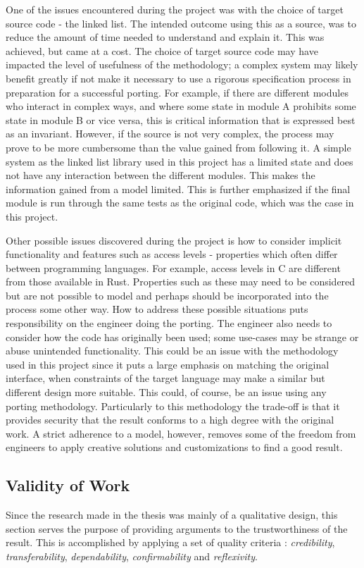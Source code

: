 One of the issues encountered during the project was with the choice of target source code - the linked list. The intended outcome using this as a source, was to reduce the amount of time needed to understand and explain it. This was achieved, but came at a cost. The choice of target source code may have impacted the level of usefulness of the methodology; a complex system may likely benefit greatly if not make it necessary to use a rigorous specification process in preparation for a successful porting. For example, if there are different modules who interact in complex ways, and where some state in module A prohibits some state in module B or vice versa, this is critical information that is expressed best as an invariant. However, if the source is not very complex, the process may prove to be more cumbersome than the value gained from following it. A simple system as the linked list library used in this project has a limited state and does not have any interaction between the different modules. This makes the information gained from a model limited. This is further emphasized if the final module is run through the same tests as the original code, which was the case in this project.

Other possible issues discovered during the project is how to consider implicit functionality and features such as access levels - properties which often differ between programming languages. For example, access levels in C are different from those available in Rust. Properties such as these may need to be considered but are not possible to model and perhaps should be incorporated into the process some other way. How to address these possible situations puts responsibility on the engineer doing the porting. The engineer also needs to consider how the code has originally been used; some use-cases may be strange or abuse unintended functionality. This could be an issue with the methodology used in this project since it puts a large emphasis on matching the original interface, when constraints of the target language may make a similar but different design more suitable. This could, of course, be an issue using any porting methodology. Particularly to this methodology the trade-off is that it provides security that the result conforms to a high degree with the original work. A strict adherence to a model, however, removes some of the freedom from engineers to apply creative solutions and customizations to find a good result. 



\subsection{Validity of Work}
Since the research made in the thesis was mainly of a qualitative design, this section serves the purpose of providing arguments to the trustworthiness of the result. This is accomplished by applying a set of quality criteria \cite{QUALITATIVE}: \textit{credibility}, \textit{transferability}, \textit{dependability}, \textit{confirmability} and \textit{reflexivity}. 

